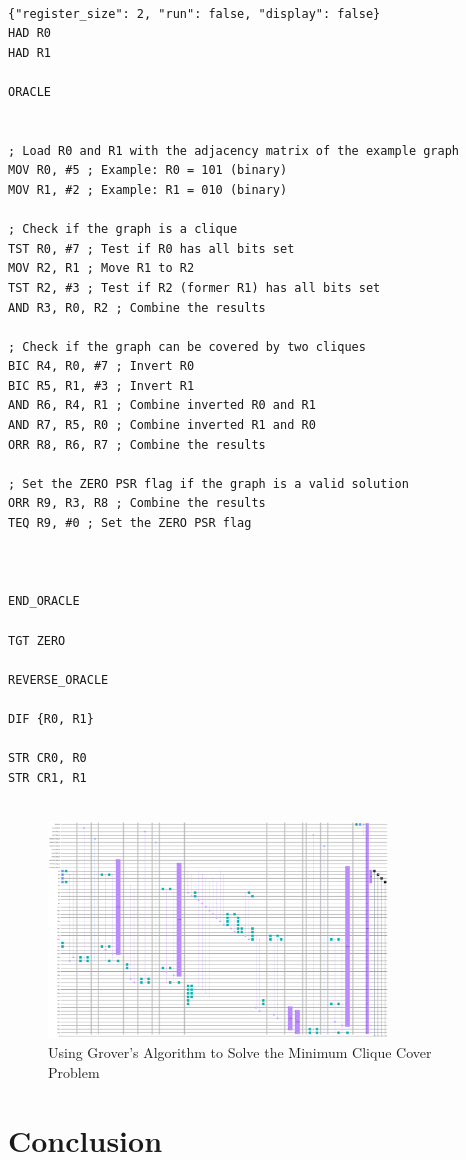 \begin{lstlisting}

{"register_size": 2, "run": false, "display": false}
HAD R0
HAD R1

ORACLE


; Load R0 and R1 with the adjacency matrix of the example graph
MOV R0, #5 ; Example: R0 = 101 (binary)
MOV R1, #2 ; Example: R1 = 010 (binary)

; Check if the graph is a clique
TST R0, #7 ; Test if R0 has all bits set
MOV R2, R1 ; Move R1 to R2
TST R2, #3 ; Test if R2 (former R1) has all bits set
AND R3, R0, R2 ; Combine the results

; Check if the graph can be covered by two cliques
BIC R4, R0, #7 ; Invert R0
BIC R5, R1, #3 ; Invert R1
AND R6, R4, R1 ; Combine inverted R0 and R1
AND R7, R5, R0 ; Combine inverted R1 and R0
ORR R8, R6, R7 ; Combine the results

; Set the ZERO PSR flag if the graph is a valid solution
ORR R9, R3, R8 ; Combine the results
TEQ R9, #0 ; Set the ZERO PSR flag



END_ORACLE

TGT ZERO

REVERSE_ORACLE

DIF {R0, R1}

STR CR0, R0
STR CR1, R1


\end{lstlisting}

\begin{figure}[htp]
    \centering
    \includegraphics[width=9cm]{Figures/Minimum_Clique_Cover_circuit.png}
    \caption{Using Grover's Algorithm to Solve the Minimum Clique Cover Problem}
    \label{fig:Minimum_Clique_Cover}
\end{figure}

\section{Conclusion}\label{sec:conclusion}


